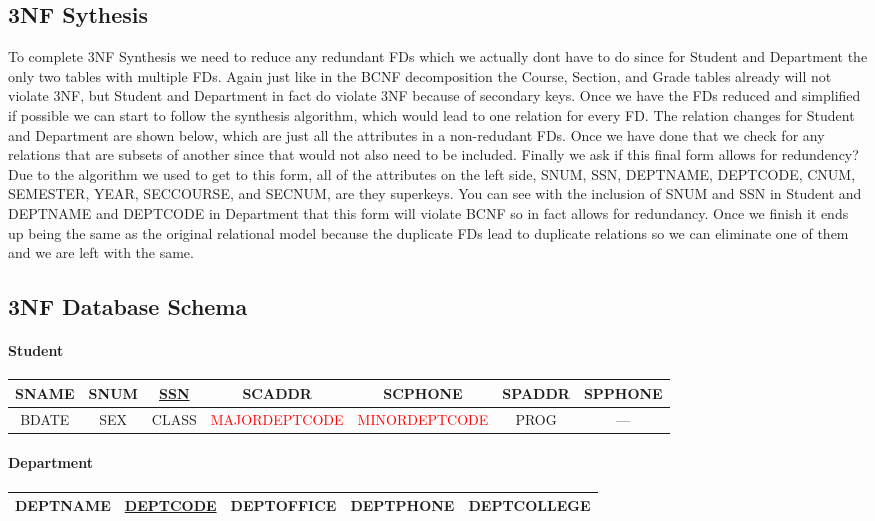 \documentclass[12pt]{article}
\begin{document}
		\subsection{3NF Sythesis}
			To complete 3NF Synthesis we need to reduce any redundant FDs which we actually dont have to do since for Student and Department the only two tables with multiple FDs. Again just like in the BCNF decomposition the Course, Section, and Grade tables already will not violate 3NF, but Student and Department in fact do violate 3NF because of secondary keys. Once we have the FDs reduced and simplified if possible we can start to follow the synthesis algorithm, which would lead to one relation for every FD. The relation changes for Student and Department are shown below, which are just all the attributes in a non-redudant FDs. Once we have done that we check for any relations that are subsets of another since that would not also need to be included. Finally we ask if this final form allows for redundency? Due to the algorithm we used to get to this form, all of the attributes on the left side, SNUM, SSN, DEPTNAME, DEPTCODE, CNUM, SEMESTER, YEAR, SECCOURSE, and SECNUM, are they superkeys. You can see with the inclusion of SNUM and SSN in Student and DEPTNAME and DEPTCODE in Department that this form will violate BCNF so in fact allows for redundancy. Once we finish it ends up being the same as the original relational model because the duplicate FDs lead to duplicate relations so we can eliminate one of them and we are left with the same.

		\subsection{3NF Database Schema}
			\paragraph{Student\\}
				\footnotesize{
					\begin{tabular}{| c | c | c | c | c | c | c |}
						\hline
						SNAME & SNUM & \underline{SSN} & SCADDR & SCPHONE & SPADDR & SPPHONE\\
						\hline
						BDATE & SEX & CLASS & \textcolor{red}{MAJORDEPTCODE} & \textcolor{red}{MINORDEPTCODE} & PROG & ---\\
						\hline
					\end{tabular}
				}

			\paragraph{Department\\}
				\footnotesize{
					\begin{tabular}{| c | c | c | c | c |}
						\hline
						DEPTNAME & \underline{DEPTCODE} & DEPTOFFICE & DEPTPHONE & DEPTCOLLEGE\\
						\hline
					\end{tabular}
				}
\end{document}
